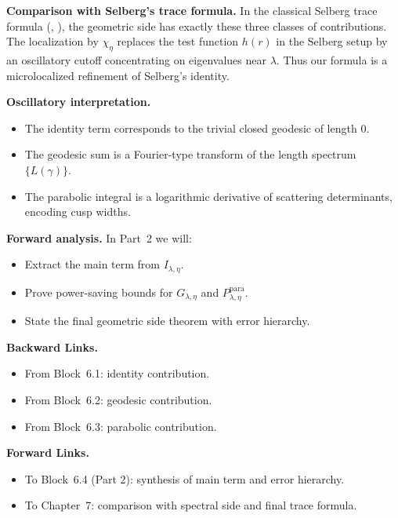 \medskip

\noindent\textbf{Comparison with Selberg’s trace formula.}
In the classical Selberg trace formula (\cite{Selberg1956}, \cite{Hejhal1983}), the geometric side has exactly these three classes of contributions.  
The localization by $\chi_\eta$ replaces the test function $h(r)$ in the Selberg setup by an oscillatory cutoff concentrating on eigenvalues near $\lambda$.  
Thus our formula is a microlocalized refinement of Selberg’s identity.

\medskip

\noindent\textbf{Oscillatory interpretation.}
\begin{itemize}
  \item The identity term corresponds to the trivial closed geodesic of length $0$.
  \item The geodesic sum is a Fourier-type transform of the length spectrum $\{L(\gamma)\}$.
  \item The parabolic integral is a logarithmic derivative of scattering determinants, encoding cusp widths.
\end{itemize}

\medskip

\noindent\textbf{Forward analysis.}
In Part~2 we will:
\begin{itemize}
  \item Extract the main term from $I_{\lambda,\eta}$.
  \item Prove power-saving bounds for $G_{\lambda,\eta}$ and $P_{\lambda,\eta}^{\mathrm{para}}$.
  \item State the final geometric side theorem with error hierarchy.
\end{itemize}

\medskip

\noindent\textbf{Backward Links.}
\begin{itemize}
  \item From Block~6.1: identity contribution.
  \item From Block~6.2: geodesic contribution.
  \item From Block~6.3: parabolic contribution.
\end{itemize}

\medskip

\noindent\textbf{Forward Links.}
\begin{itemize}
  \item To Block~6.4 (Part 2): synthesis of main term and error hierarchy.
  \item To Chapter~7: comparison with spectral side and final trace formula.
\end{itemize}

